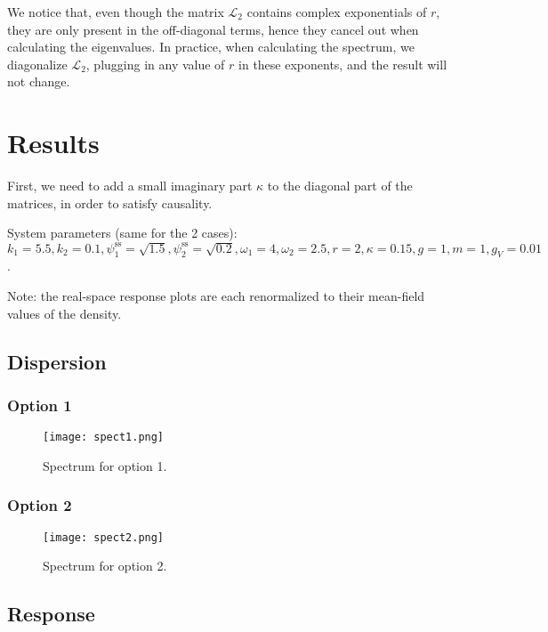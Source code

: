 \documentclass[12pt]{article}
\begin{document}
We notice that, even though the matrix $\mathcal{L}_2$ contains complex exponentials of $r$, they are only present in the off-diagonal terms, hence they cancel out when calculating the eigenvalues. In practice, when calculating the spectrum, we diagonalize $\mathcal{L}_2$, plugging in any value of $r$ in these exponents, and the result will not change.

\section{Results}
First, we need to add a small imaginary part $\kappa$ to the diagonal part of the matrices, in order to satisfy causality. 

System parameters (same for the 2 cases): $k_1=5.5, k_2=0.1, \psi_{1}^{\text{ss}}=\sqrt{1.5}, \psi_{2}^{\text{ss}}=\sqrt{0.2}, \omega_1=4, \omega_2=2.5, r=2, \kappa=0.15, g=1, m=1, g_V=0.01$.

Note: the real-space response plots are each renormalized to their mean-field values of the density.

\subsection{Dispersion}
\subsubsection{Option 1}
\begin{figure}
\texttt{[image: spect1.png]}
\caption{\label{fig:spect1}Spectrum for option 1.}
\end{figure}
\subsubsection{Option 2}
\begin{figure}
\texttt{[image: spect2.png]}
\caption{\label{fig:spect2}Spectrum for option 2.}
\end{figure}

\subsection{Response}
\end{document}
